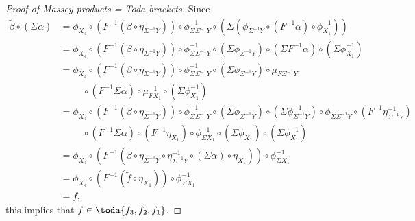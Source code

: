\begin{proof}[Proof of Massey products = Toda brackets]
    Since
    \begin{align*}
        \tilde{\beta} \circ (\Sigma \tilde{\alpha}) &= \phi_{X_4} \circ (F^{-1} (\beta \circ \eta_{\Sigma^{-1} Y})) \circ \phi^{-1}_{\Sigma \Sigma^{-1} Y} \circ
        (\Sigma (\phi_{\Sigma^{-1} Y} \circ (F^{-1} \alpha) \circ \phi^{-1}_{X_1})) \\
        &= \phi_{X_4} \circ (F^{-1} (\beta \circ \eta_{\Sigma^{-1} Y})) \circ \phi^{-1}_{\Sigma \Sigma^{-1} Y} \circ
        (\Sigma \phi_{\Sigma^{-1} Y}) \circ (\Sigma F^{-1} \alpha) \circ (\Sigma \phi^{-1}_{X_1}) \\
        &= \phi_{X_4} \circ (F^{-1} (\beta \circ \eta_{\Sigma^{-1} Y})) \circ \phi^{-1}_{\Sigma \Sigma^{-1} Y} \circ
        (\Sigma \phi_{\Sigma^{-1} Y}) \circ \mu_{F \Sigma^{-1} Y} \\
        &\hspace{1cm} \circ (F^{-1} \Sigma \alpha) \circ \mu^{-1}_{F X_1} \circ (\Sigma \phi^{-1}_{X_1}) \\
        &= \phi_{X_4} \circ (F^{-1} (\beta \circ \eta_{\Sigma^{-1} Y})) \circ \phi^{-1}_{\Sigma \Sigma^{-1} Y} \circ
        (\Sigma \phi_{\Sigma^{-1} Y}) \circ (\Sigma \phi^{-1}_{\Sigma^{-1} Y}) \circ \phi_{\Sigma \Sigma^{-1} Y} \circ (F^{-1} \eta^{-1}_{\Sigma^{-1} Y}) \\
        &\hspace{1cm} \circ (F^{-1} \Sigma \alpha) \circ (F^{-1} \eta_{X_1}) \circ \phi^{-1}_{\Sigma X_1} \circ (\Sigma \phi_{X_1}) \circ (\Sigma \phi^{-1}_{X_1}) \\
        &= \phi_{X_4} \circ (F^{-1} (\beta \circ \eta_{\Sigma^{-1} Y} \circ \eta^{-1}_{\Sigma^{-1} Y} \circ (\Sigma \alpha) \circ \eta_{X_1})) \circ \phi^{-1}_{\Sigma X_1} \\
        &= \phi_{X_4} \circ (F^{-1} (\tilde{f} \circ \eta_{X_1})) \circ \phi^{-1}_{\Sigma X_1} \\
        &= f,
    \end{align*}
    this implies that \( f \in \toda{f_3, f_2, f_1} \).
\end{proof}